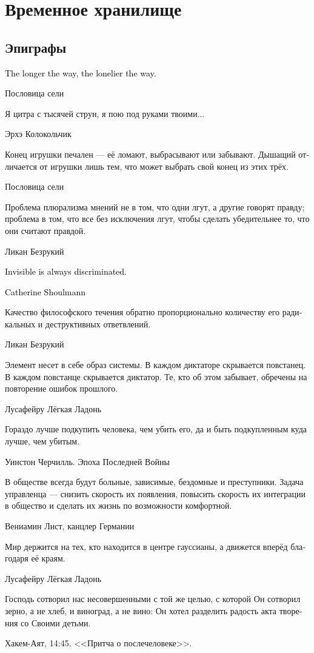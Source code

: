 \documentclass[a4paper,12pt,fleqn]{book}\usepackage{cooltooltips}\usepackage{polyglossia}\setdefaultlanguage[babelshorthands=true]{russian}\setotherlanguage{english}\defaultfontfeatures{Ligatures=TeX,Mapping=tex-text} \usepackage{xcolor}\definecolor{lightgray}{HTML}{bbbbbb}\color{lightgray}\newcommand{\ml}[3]{\textenglish{\textcolor{black}{#3}}}
\begin{document}
{\part{Временное хранилище}

\chapter{Эпиграфы}

\epigraph{
\ml{$0$}
{Чем дальше путь, тем больше одиночество.}
{The longer the way, the lonelier the way.}
}{Пословица сели}

\epigraph{Я цитра с тысячей струн, я пою под руками твоими...}
{Эрхэ Колокольчик}

\epigraph{
Конец игрушки печален --- её ломают, выбрасывают или забывают.
Дышащий отличается от игрушки лишь тем, что может выбрать свой конец из этих трёх.
}{
Пословица сели
}

\epigraph
{Проблема плюрализма мнений не в том, что одни лгут, а другие говорят правду;
проблема в том, что все без исключения лгут, чтобы сделать убедительнее то, что они считают правдой.}
{Ликан Безрукий}

\epigraph{
\ml{$0$}
{То, что невидимо, всегда дискриминируемо.}
{Invisible is always discriminated.}
}{
\ml{$0$}
{Кэтрин Шаулман, Эпоха Последней Войны}
{Catherine Shoulmann}}

\epigraph
{Качество философского течения обратно пропорционально количеству его радикальных и деструктивных ответвлений.}
{Ликан Безрукий}

\epigraph
{Элемент несет в себе образ системы.
В каждом диктаторе скрывается повстанец.
В каждом повстанце скрывается диктатор.
Те, кто об этом забывает, обречены на повторение ошибок прошлого.}
{Лусафейру Лёгкая Ладонь}

\epigraph
{Гораздо лучше подкупить человека, чем убить его, да и быть подкупленным куда лучше, чем убитым.}
{Уинстон Черчилль.
Эпоха Последней Войны}

\epigraph
{В обществе всегда будут больные, зависимые, бездомные и преступники.
Задача управленца --- снизить скорость их появления, повысить скорость их интеграции в общество и сделать их жизнь по возможности комфортной.}
{Вениамин Лист, канцлер Германии}

\epigraph
{Мир держится на тех, кто находится в центре гауссианы, а движется вперёд благодаря её краям.}
{Лусафейру Лёгкая Ладонь}

\epigraph
{Господь сотворил нас несовершенными с той же целью, с которой Он сотворил зерно, а не хлеб, и виноград, а не вино: Он хотел разделить радость акта творения со Своими детьми.}
{Хакем-Аят, 14:45.
<<Притча о послечеловеке>>.}

}
\end{document}
